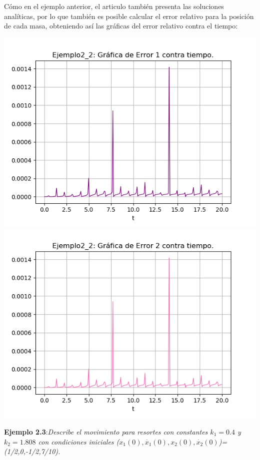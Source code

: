 \documentclass{article}
\begin{document}
Cómo en el ejemplo anterior, el articulo también presenta las soluciones analíticas, por lo que también es posible calcular el error relativo para la posición de cada masa, obteniendo así las gráficas del error relativo contra el tiempo:
\begin{center}
    \includegraphics[width=.4\textwidth]{Ejemplo2_2Error1.png}
    \includegraphics[width=.4\textwidth]{Ejemplo2_2Error2.png}
\end{center}

\textbf{Ejemplo 2.3}:\textsl{Describe el movimiento para resortes con constantes $k_{1}=0.4$ y $k_{2}=1.808$ con condiciones iniciales ($x_{1}(0),\dot{x_{1}}(0), x_{2}(0),\dot{x_{2}}(0)$)=(1/2,0,-1/2,7/10).}
\end{document}
